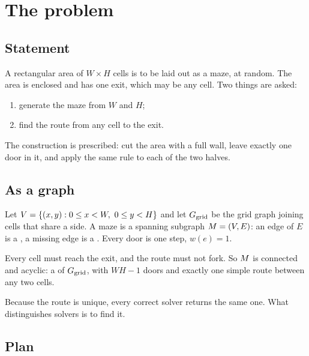 \section{The problem}
\label{sec:problem}

\subsection{Statement}

A rectangular area of $W\times H$ cells is to be laid out as a maze, at random.
The area is enclosed and has one exit, which may be any cell. Two things are
asked:

\begin{enumerate}[label=\arabic*.,leftmargin=*,itemsep=2pt]
  \item generate the maze from $W$ and $H$;
  \item find the route from any cell to the exit.
\end{enumerate}

The construction is prescribed: cut the area with a full wall, leave exactly one
door in it, and apply the same rule to each of the two halves.

\subsection{As a graph}

Let $V=\{(x,y): 0\le x<W,\ 0\le y<H\}$ and let $G_{\text{grid}}$ be the grid
graph joining cells that share a side. A maze is a spanning subgraph
$M=(V,E)$: an edge of $E$ is a , a missing edge is a
. Every door is one step, $w(e)=1$.

\begin{keypoint}
Every cell must reach the exit, and the route must not fork. So $M$ is
connected and acyclic: a  of $G_{\text{grid}}$, with $WH-1$
doors and exactly one simple route between any two cells.
\end{keypoint}

Because the route is unique, every correct solver returns the same one. What
distinguishes solvers is  to find it.



\subsection{Plan}

